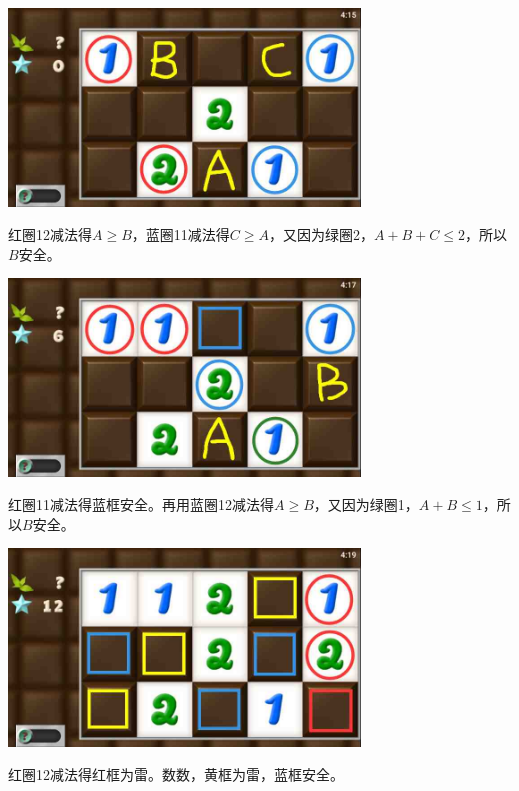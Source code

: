 \subsection{} %
\begin{center}
    \includegraphics[width=0.7\textwidth]{puzzlelow/93-1.jpg}
\end{center}
红圈12减法得$A\ge B$，蓝圈11减法得$C\ge A$，又因为绿圈2，$A+B+C\le 2$，所以$B$安全。
\begin{center}
    \includegraphics[width=0.7\textwidth]{puzzlelow/93-2.jpg}
\end{center}
红圈11减法得蓝框安全。再用蓝圈12减法得$A\ge B$，又因为绿圈1，$A+B\le 1$，所以$B$安全。
\begin{center}
    \includegraphics[width=0.7\textwidth]{puzzlelow/93-3.jpg}
\end{center}
红圈12减法得红框为雷。数数，黄框为雷，蓝框安全。

